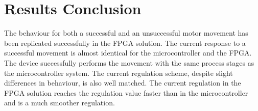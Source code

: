 


%

%

\section{Results Conclusion}

The behaviour for both a successful and an unsuccessful motor movement has been replicated successfully in the FPGA solution. The current response to a successful movement is almost identical for the microcontroller and the FPGA. The device successfully performs the movement with the same process stages as the microcontroller system. The current regulation scheme, despite slight differences in behaviour, is also well matched. The current regulation in the FPGA solution reaches the regulation value faster than in the microcontroller and is a much smoother regulation.